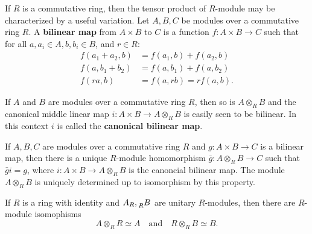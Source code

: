 \documentclass{article}
\begin{document}
If $R$ is a commutative ring, then the tensor product of $R$-module may be characterized by a useful variation. Let $A,B,C$ be modules over a commutative ring $R$. A \textbf{bilinear map} from $A\times B$ to $C$ is a function $f:A\times B\to C$ such that for all $a,a_{i} \in A, b,b_{i} \in B$, and $r \in R$:
\begin{equation*}
    \begin{aligned}
    f(a_{1}+a_{2},b) &= f(a_{1},b) + f(a_{2},b) \\
    f(a,b_{1}+b_{2}) &= f(a,b_{1}) + f(a,b_{2}) \\
    f(ra,b) &= f(a,rb) =rf(a,b).
    \end{aligned}
\end{equation*}

If $A$ and $B$ are modules over a commutative ring $R$, then so is $A\otimes_R B$ and the canonical middle linear map $i:A\times B\to A\otimes_R B$ is easily seen to be bilinear. In this context $i$ is called the \textbf{canonical bilinear map}.

\begin{theorem}
    If $A,B,C$ are modules over a commutative ring $R$ and $g:A\times B\to C$ is a bilinear map, then there is a unique $R$-module homomorphism $\bar{g}:A\otimes_R B\to C$ such that $\bar{g}i=g$, where $i:A\times B\to A\otimes_R B$ is the canoncial bilinear map. The module $A \otimes_R B$ is uniquely determined up to isomorphism by this property. 
\end{theorem}

\begin{theorem}
    If $R$ is a ring with identity and $A_R, \tensor[_R]{B}{}$ are unitary $R$-modules, then there are $R$-module isomophisms
    \begin{equation*}
        A \otimes_R R \simeq A \quad \text{and} \quad R \otimes_R B \simeq B.
    \end{equation*}
\end{theorem}
\end{document}
